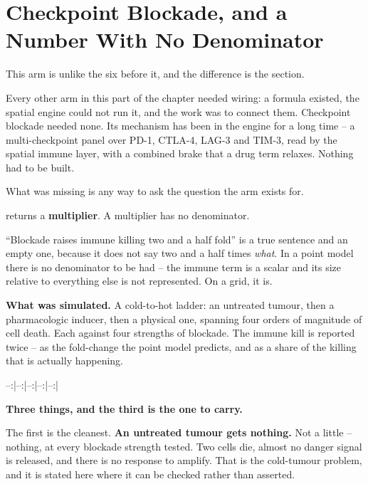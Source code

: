 \documentclass[11pt,twoside,openright]{report}
\begin{document}
\section{Checkpoint Blockade, and a Number With No Denominator}

This arm is unlike the six before it, and the difference is the section.

Every other arm in this part of the chapter needed wiring: a formula existed, the spatial engine could not run it, and the work was to connect them. Checkpoint blockade needed none. Its mechanism has been in the engine for a long time -- a multi-checkpoint panel over PD-1, CTLA-4, LAG-3 and TIM-3, read by the spatial immune layer, with a combined brake that a drug term relaxes. Nothing had to be built.

What was missing is any way to ask the question the arm exists for.

\begin{finding}
 returns a \textbf{multiplier}. A multiplier has no denominator.

``Blockade raises immune killing two and a half fold'' is a true sentence and an empty one, because it does not say two and a half times \textit{what}. In a point model there is no denominator to be had -- the immune term is a scalar and its size relative to everything else is not represented. On a grid, it is.
\end{finding}

\textbf{What was simulated.} A cold-to-hot ladder: an untreated tumour, then a pharmacologic inducer, then a physical one, spanning four orders of magnitude of cell death. Each against four strengths of blockade. The immune kill is reported twice -- as the fold-change the point model predicts, and as a share of the killing that is actually happening.

\begin{numbers}

--:|--:|--:|--:|--:|



\end{numbers}

\textbf{Three things, and the third is the one to carry.}

The first is the cleanest. \textbf{An untreated tumour gets nothing.} Not a little -- nothing, at every blockade strength tested. Two cells die, almost no danger signal is released, and there is no response to amplify. That is the cold-tumour problem, and it is stated here where it can be checked rather than asserted.
\end{document}
